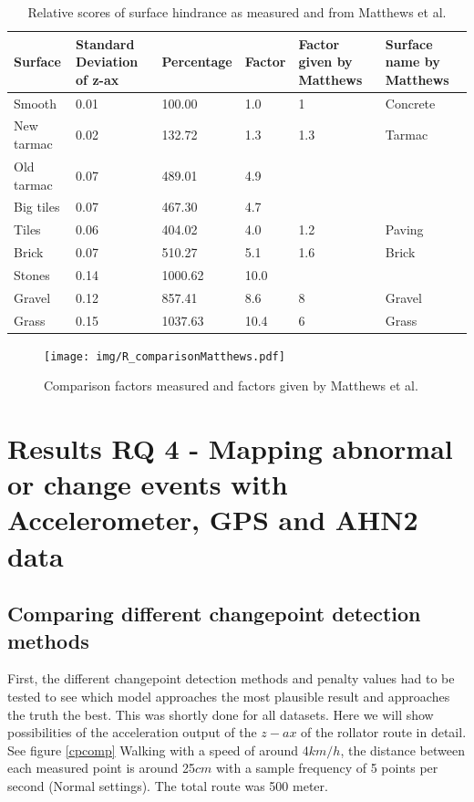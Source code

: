 \begin{table}[hb]
\caption{Relative scores of surface hindrance as measured and from Matthews et al. \label{compare}}
\centering
\begin{tabular}{|p{67.6pt}|p{55.6pt}|p{55.6pt}|p{55.6pt}|p{55.6pt}|p{55.6pt}|}
\hline
Surface & Standard Deviation of z-ax & Percentage & Factor & Factor given by Matthews & Surface name by Matthews \\
\hline
Smooth & 0.01 & 100.00 & 1.0 & 1 & Concrete \\
New tarmac & 0.02 & 132.72 & 1.3 & 1.3 & Tarmac\\
Old tarmac & 0.07 & 489.01 & 4.9 & &  \\
Big tiles & 0.07 & 467.30 & 4.7 & & \\
Tiles & 0.06 & 404.02 & 4.0 & 1.2 & Paving \\
Brick & 0.07 & 510.27 & 5.1 & 1.6 & Brick \\
Stones & 0.14 & 1000.62 & 10.0 & & \\
Gravel & 0.12 & 857.41 & 8.6 & 8 & Gravel \\
Grass & 0.15 & 1037.63 & 10.4 & 6 & Grass \\
\hline 
\end{tabular}
\end{table}

\begin{figure}[hb]
\texttt{[image: img/R\_comparisonMatthews.pdf]}
\centering
\caption{Comparison factors measured and factors given by Matthews et al.\label{comparefig}}
\end{figure} 

\clearpage



\section{Results RQ 4 - Mapping abnormal or change events with Accelerometer, GPS and AHN2 data}\label{Rrq2c}

\subsection{Comparing different changepoint detection methods}

First, the different changepoint detection methods and penalty values had to be tested to see which model approaches the most plausible result and approaches the truth the best. This was shortly done for all datasets. Here we will show possibilities of the acceleration output of the $z-ax$ of the rollator route in detail. See figure \ref{cpcomp} Walking with a speed of around 4$km/h$, the distance between each measured point is around 25$cm$ with a sample frequency of 5 points per second (Normal settings). The total route was 500 meter. 

